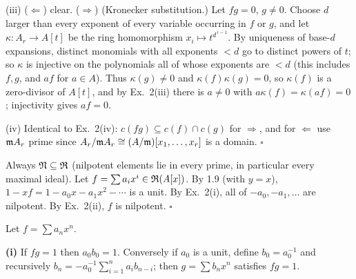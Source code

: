 \documentclass[11pt]{article}
\begin{document}
(iii) ($\Leftarrow$) clear. ($\Rightarrow$) (Kronecker substitution.) Let $fg=0$, $g\neq0$. Choose $d$ larger than every exponent of every variable occurring in $f$ or $g$, and let $\kappa:A_r\to A[t]$ be the ring homomorphism $x_i\mapsto t^{d^{\,i-1}}$. By uniqueness of base-$d$ expansions, distinct monomials with all exponents $<d$ go to distinct powers of $t$; so $\kappa$ is injective on the polynomials all of whose exponents are $<d$ (this includes $f,g$, and $af$ for $a\in A$). Thus $\kappa(g)\ne0$ and $\kappa(f)\kappa(g)=0$, so $\kappa(f)$ is a zero-divisor of $A[t]$, and by Ex.~2(iii) there is $a\ne0$ with $a\kappa(f)=\kappa(af)=0$; injectivity gives $af=0$.

(iv) Identical to Ex.~2(iv): $c(fg)\subseteq c(f)\cap c(g)$ for $\Rightarrow$, and for $\Leftarrow$ use $\mathfrak m A_r$ prime since $A_r/\mathfrak m A_r\cong(A/\mathfrak m)[x_1,\dots,x_r]$ is a domain. \hfill$\square$

\pf
Always $\mathfrak N\subseteq\mathfrak R$ (nilpotent elements lie in every prime, in particular every maximal ideal). Let $f=\sum a_ix^i\in\mathfrak R(A[x])$. By 1.9 (with $y=x$), $1-xf=1-a_0x-a_1x^2-\cdots$ is a unit. By Ex.~2(i), all of $-a_0,-a_1,\dots$ are nilpotent. By Ex.~2(ii), $f$ is nilpotent. \hfill$\square$

\pf
Let $f=\sum a_nx^n$.

\textbf{(i)} If $fg=1$ then $a_0b_0=1$. Conversely if $a_0$ is a unit, define $b_0=a_0^{-1}$ and recursively $b_n=-a_0^{-1}\sum_{i=1}^na_ib_{n-i}$; then $g=\sum b_nx^n$ satisfies $fg=1$.
\end{document}
